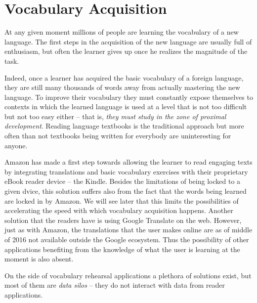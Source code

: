 
\section{Vocabulary Acquisition}


At any given moment millions of people are learning the vocabulary of a new language. The first steps in the acquisition of the new language are usually full of enthusiasm, but often the learner gives up once he realizes the magnitude of the task.

Indeed, once a learner has acquired the basic vocabulary of a foreign language, they are still many thousands of words away from actually mastering the new language. To improve their vocabulary they must constantly expose themselves to contexts in which the learned language is used at a level that is not too difficult but not too easy either -- that is, {\em they must study in the zone of proximal development}. Reading language textbooks is the traditional approach but more often than not textbooks being written for everybody are uninteresting for anyone.

Amazon has made a first step towards allowing the learner to read engaging texts by integrating translations and basic vocabulary exercises with their proprietary eBook reader device -- the Kindle. Besides the limitations of being locked to a given dvice, this solution suffers also from the fact that the words being learned are locked in by Amazon. We will see later that this limits the possibilities of accelerating the speed with which vocabulary acquisition happens.
Another solution that the readers have is using Google Translate on the web. However, just as with Amazon, the translations that the user makes online are as of middle of 2016 not available outside the Google ecosystem. Thus the possibility of other applications benefiting from the knowledge of what the user is learning at the moment is also absent.

On the side of vocabulary rehearsal applications a plethora of solutions exist, but most of them are {\em data silos} -- they do not interact with data from reader applications. 

